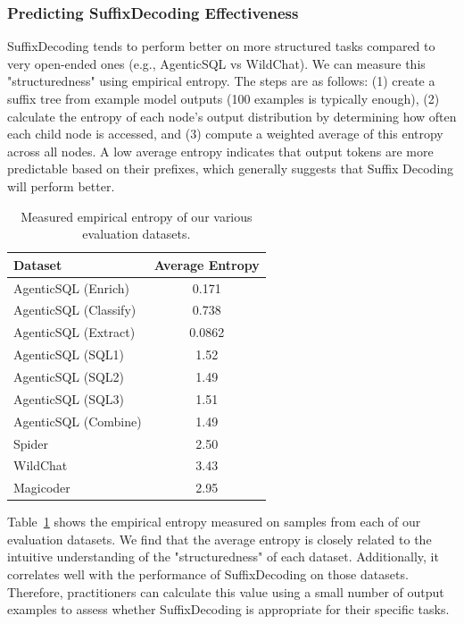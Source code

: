 \subsubsection{Predicting SuffixDecoding Effectiveness}
\label{sec:measuring-entropy}

SuffixDecoding tends to perform better on more structured tasks compared to very open-ended ones (e.g., AgenticSQL vs WildChat). We can measure this "structuredness" using empirical entropy. The steps are as follows: (1) create a suffix tree from example model outputs (100 examples is typically enough), (2) calculate the entropy of each node’s output distribution by determining how often each child node is accessed, and (3) compute a weighted average of this entropy across all nodes. A low average entropy indicates that output tokens are more predictable based on their prefixes, which generally suggests that Suffix Decoding will perform better.

\begin{table}[htbp]
\caption{Measured empirical entropy of our various evaluation datasets.}
\label{tab:entropy}
\small
\centering
\begin{tabular}{lc}
\toprule
Dataset & Average Entropy \\
\midrule
AgenticSQL (Enrich)   & 0.171 \\
AgenticSQL (Classify) & 0.738 \\
AgenticSQL (Extract)  & 0.0862 \\
AgenticSQL (SQL1)     & 1.52 \\
AgenticSQL (SQL2)     & 1.49 \\
AgenticSQL (SQL3)     & 1.51 \\
AgenticSQL (Combine)  & 1.49 \\
Spider                & 2.50 \\
WildChat              & 3.43 \\
Magicoder             & 2.95 \\
\bottomrule
\end{tabular}
\end{table}

Table~\ref{tab:entropy} shows the empirical entropy measured on samples from each of our evaluation datasets. We find that the average entropy is closely related to the intuitive understanding of the "structuredness" of each dataset. Additionally, it correlates well with the performance of SuffixDecoding on those datasets. Therefore, practitioners can calculate this value using a small number of output examples to assess whether SuffixDecoding is appropriate for their specific tasks.



